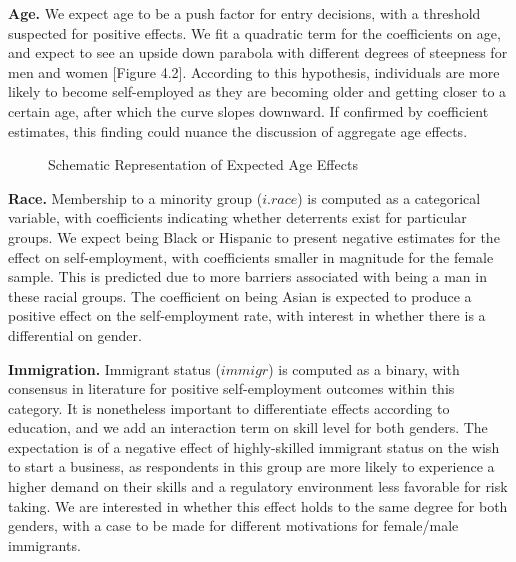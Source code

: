 \textbf{Age.} We expect age to be a push factor for entry decisions, with a threshold suspected for positive effects. We fit a quadratic term for the coefficients on age, and expect to see an upside down parabola with different degrees of steepness for men and women [Figure 4.2]. According to this hypothesis, individuals are more likely to become self-employed as they are becoming older and getting closer to a certain age, after which the curve slopes downward. If confirmed by coefficient estimates, this finding could nuance the discussion of aggregate age effects. 

\begin{figure}[hbtp]
    \caption{Schematic Representation of Expected Age Effects} 
\end{figure}

\textbf{Race.} Membership to a minority group ($i.race$) is computed as a categorical variable, with coefficients indicating whether deterrents exist for particular groups. We expect being Black or Hispanic to present negative estimates for the effect on self-employment, with coefficients smaller in magnitude for the female sample. This is predicted due to more barriers associated with being a man in these racial groups. The coefficient on being Asian is expected to produce a positive effect on the self-employment rate, with interest in whether there is a differential on gender. 


\textbf{Immigration.} Immigrant status ($immigr$) is computed as a binary, with consensus in literature for positive self-employment outcomes within this category. It is nonetheless important to differentiate effects according to education, and we add an interaction term on skill level for both genders. The expectation is of a negative effect of highly-skilled immigrant status on the wish to start a business, as respondents in this group are more likely to experience a higher demand on their skills and a regulatory environment less favorable for risk taking. We are interested in whether this effect holds to the same degree for both genders, with a case to be made for different motivations for female/male immigrants. 


